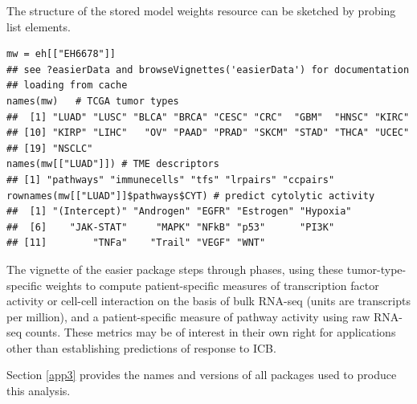 The structure of the stored model weights resource can be sketched by probing list elements.

\begin{shaded}
\begin{verbatim}
mw = eh[["EH6678"]]
## see ?easierData and browseVignettes('easierData') for documentation
## loading from cache
names(mw)   # TCGA tumor types
##  [1] "LUAD" "LUSC" "BLCA" "BRCA" "CESC" "CRC"  "GBM"  "HNSC" "KIRC"
## [10] "KIRP" "LIHC"   "OV" "PAAD" "PRAD" "SKCM" "STAD" "THCA" "UCEC"
## [19] "NSCLC"
names(mw[["LUAD"]]) # TME descriptors
## [1] "pathways" "immunecells" "tfs" "lrpairs" "ccpairs"
rownames(mw[["LUAD"]]$pathways$CYT) # predict cytolytic activity
##  [1] "(Intercept)" "Androgen" "EGFR" "Estrogen" "Hypoxia"
##  [6]    "JAK-STAT"     "MAPK" "NFkB" "p53"      "PI3K"
## [11]        "TNFa"    "Trail" "VEGF" "WNT"
\end{verbatim}
\end{shaded}


The vignette of the easier package steps through phases,
using these tumor-type-specific weights to compute patient-specific measures
of transcription factor activity or cell-cell interaction on the basis of bulk
RNA-seq (units are transcripts per million), and a patient-specific
measure of pathway activity using raw RNA-seq counts. These metrics
may be of interest in their own right for applications other than
establishing predictions of response to ICB.

Section \ref{app3} provides the names and versions of all packages
used to produce this analysis.

